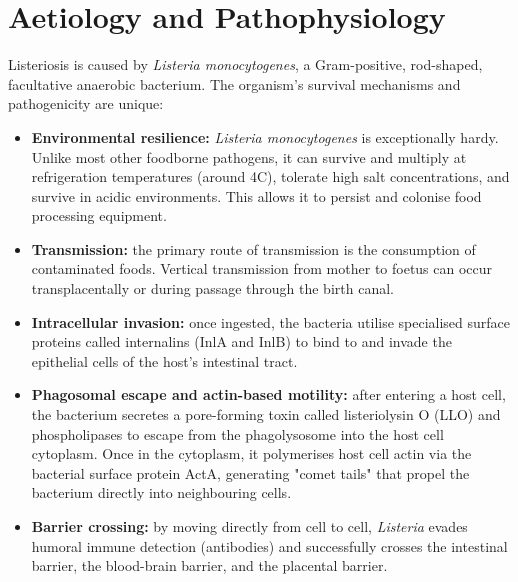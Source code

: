 \section*{Aetiology and Pathophysiology}
Listeriosis is caused by \textit{Listeria monocytogenes}, a Gram-positive, rod-shaped, facultative anaerobic bacterium. The organism's survival mechanisms and pathogenicity are unique:
\begin{itemize}
    \item \textbf{Environmental resilience:} \textit{Listeria monocytogenes} is exceptionally hardy. Unlike most other foodborne pathogens, it can survive and multiply at refrigeration temperatures (around 4\textdegree C), tolerate high salt concentrations, and survive in acidic environments. This allows it to persist and colonise food processing equipment.
    \item \textbf{Transmission:} the primary route of transmission is the consumption of contaminated foods. Vertical transmission from mother to foetus can occur transplacentally or during passage through the birth canal.
    \item \textbf{Intracellular invasion:} once ingested, the bacteria utilise specialised surface proteins called internalins (InlA and InlB) to bind to and invade the epithelial cells of the host's intestinal tract.
    \item \textbf{Phagosomal escape and actin-based motility:} after entering a host cell, the bacterium secretes a pore-forming toxin called listeriolysin O (LLO) and phospholipases to escape from the phagolysosome into the host cell cytoplasm. Once in the cytoplasm, it polymerises host cell actin via the bacterial surface protein ActA, generating "comet tails" that propel the bacterium directly into neighbouring cells.
    \item \textbf{Barrier crossing:} by moving directly from cell to cell, \textit{Listeria} evades humoral immune detection (antibodies) and successfully crosses the intestinal barrier, the blood-brain barrier, and the placental barrier.
\end{itemize}

